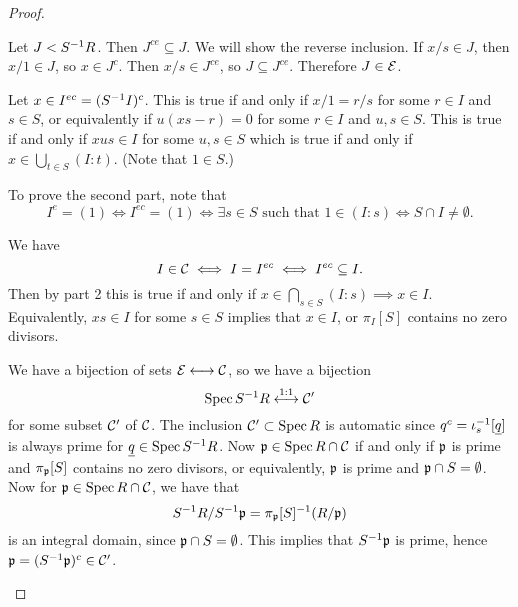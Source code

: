 \begin{proof}
  \leavevmode
  \begin{enum}
    \io
    Let $J<S^{-1} R$.
    Then $J^{ce} \subseteq J$.
    We will show the reverse inclusion.
    If $x/s \in J$, then $x/1 \in J$, so $x \in J^c$.
    Then $x/s \in J^{ce}$, so $J \subseteq J^{ce}$.
    Therefore $J \in \mathcal{E}$.

    \io
    Let $x \in I^{ec} = (S^{-1} I)^c$.
    This is true if and only if $x/1=r/s$ for some $r \in I$ and $s \in S$, or equivalently if $u(xs-r)=0$ for some $r \in I$ and $u,s \in S$.
    This is true if and only if $xus \in I$ for some $u,s \in S$ which is true if and only if $x \in \bigcup_{t \in S} (I:t)$.
    (Note that $1 \in S$.)

    To prove the second part, note that
    \[I^e = (1) \iff I^{ec} = (1) \iff \exists s \in S \text{ such that } 1 \in (I:s) \iff S \cap I \neq \emptyset.\]

    \io
    We have
    \[I \in \mathcal{C} \iff I = I^{ec} \iff I^{ec} \subseteq I.\]
    Then by part 2 this is true if and only if $x \in \bigcap_{s \in S} (I:s) \implies x \in I$.
    Equivalently, $xs \in I$ for some $s \in S$ implies that $x \in I$, or $\pi_I[S]$ contains no zero divisors.

    \io
    We have a bijection of sets $\mathcal{E} \longleftrightarrow \mathcal{C}$, so we have a bijection
    \[\operatorname{Spec} S^{-1} R \overset{1:1}{\longleftrightarrow} \mathcal{C}'\]
    for some subset $\mathcal{C}'$ of $\mathcal{C}$.
    The inclusion $\mathcal{C}' \subset \operatorname{Spec} R$ is automatic since $q^c = \iota_s^{-1}[\underline q]$ is always prime for $\underline q \in \operatorname{Spec} S^{-1} R$.
    Now $\mathfrak{p} \in \operatorname{Spec} R \cap \mathcal{C}$ if and only if $\mathfrak{p}$ is prime and $\pi_{\mathfrak{p}}[S]$ contains no zero divisors, or equivalently, $\mathfrak{p}$ is prime and $\mathfrak{p} \cap S = \emptyset$.
    Now for $\mathfrak{p} \in \operatorname{Spec} R \cap \mathcal{C}$, we have that
    \[S^{-1} R / S^{-1} \mathfrak{p} = \pi_{\mathfrak{p}}[S]^{-1} (R/\mathfrak{p})\]
    is an integral domain, since $\mathfrak{p} \cap S = \emptyset$.
    This implies that $S^{-1} \mathfrak{p}$ is prime, hence $\mathfrak{p} = (S^{-1} \mathfrak{p})^c \in \mathcal{C}'$.
    \qedhere
  \end{enum}
\end{proof}
